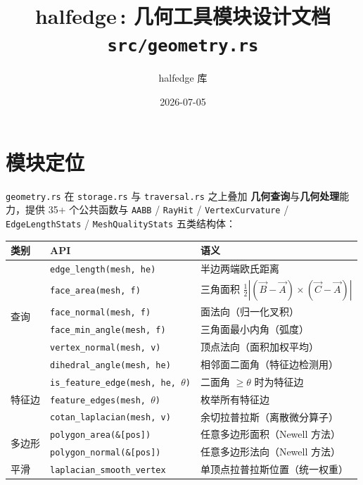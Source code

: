 \documentclass[11pt,a4paper]{article}
\title{\textbf{halfedge\,: 几何工具模块设计文档} \\ \large \texttt{src/geometry.rs}}
\author{halfedge 库}
\date{2026-07-05}
\begin{document}
\maketitle
\tableofcontents

\section{模块定位}

\texttt{geometry.rs} 在 \texttt{storage.rs} 与 \texttt{traversal.rs} 之上叠加
\textbf{几何查询}与\textbf{几何处理}能力，提供 35+ 个公共函数与
\texttt{AABB} / \texttt{RayHit} / \texttt{VertexCurvature} /
\texttt{EdgeLengthStats} / \texttt{MeshQualityStats} 五类结构体：

\begin{center}
\renewcommand{\arraystretch}{1.18}
\begin{tabular}{@{}lll@{}}
  \toprule
  \textbf{类别} & \textbf{API} & \textbf{语义} \\
  \midrule
  \multirow{6}{*}{查询}
    & \texttt{edge\_length(mesh, he)}        & 半边两端欧氏距离 \\
    & \texttt{face\_area(mesh, f)}           & 三角面积 $\frac{1}{2}|(\vec{B}-\vec{A})\times(\vec{C}-\vec{A})|$ \\
    & \texttt{face\_normal(mesh, f)}         & 面法向（归一化叉积） \\
    & \texttt{face\_min\_angle(mesh, f)}     & 三角面最小内角（弧度） \\
    & \texttt{vertex\_normal(mesh, v)}       & 顶点法向（面积加权平均） \\
    & \texttt{dihedral\_angle(mesh, he)}     & 相邻面二面角（特征边检测用） \\
  \midrule
  \multirow{3}{*}{特征边}
    & \texttt{is\_feature\_edge(mesh, he, $\theta$)} & 二面角 $\ge \theta$ 时为特征边 \\
    & \texttt{feature\_edges(mesh, $\theta$)}        & 枚举所有特征边 \\
    & \texttt{cotan\_laplacian(mesh, v)}             & 余切拉普拉斯（离散微分算子） \\
  \midrule
  \multirow{2}{*}{多边形}
    & \texttt{polygon\_area(\&[pos])}        & 任意多边形面积（Newell 方法） \\
    & \texttt{polygon\_normal(\&[pos])}      & 任意多边形法向（Newell 方法） \\
  \midrule
  \multirow{4}{*}{平滑}
    & \texttt{laplacian\_smooth\_vertex}     & 单顶点拉普拉斯位置（统一权重） \\

\end{tabular}
\end{center}
\end{document}
